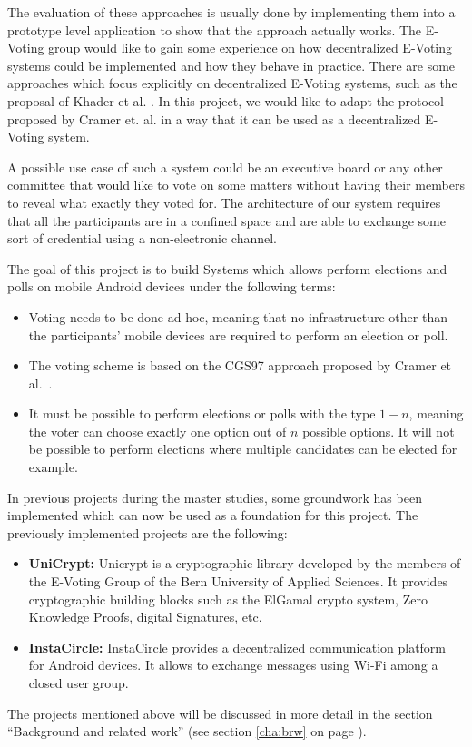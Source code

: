 \documentclass[numbers=noenddot, abstract=on]{scrreprt}
\newcommand{\myref}[1]{(see section \ref{#1} on page \pageref{#1})}
\begin{document}
The evaluation of these approaches is usually done by implementing them into a
prototype level application to show that the approach actually works. The
E-Voting group would like to gain some experience on how decentralized E-Voting
systems could be implemented and how they behave in practice. There are some
approaches which focus explicitly on decentralized E-Voting systems, such as the
proposal of Khader et al. \cite{HKRS12}. In this project, we would like to adapt
the protocol proposed by Cramer et. al. \cite{CGS97} in a way that it can be
used as a decentralized E-Voting system.

A possible use case of such a system could be an executive board or any other
committee that would like to vote on some matters without having their members
to reveal what exactly they voted for. The architecture of our system requires
that all the participants are in a confined space and are able to exchange some
sort of credential using a non-electronic channel.

The goal of this project is to build Systems which allows perform elections and
polls on mobile Android devices under the following terms:
\begin{itemize}
  \item Voting needs to be done ad-hoc, meaning that no infrastructure other
  than the participants' mobile devices are required to perform an election or
  poll.
  \item The voting scheme is based on the CGS97 approach proposed by Cramer et
  al.~\cite{CGS97}.
  \item It must be possible to perform elections or polls with the type $1-n$,
  meaning the voter can choose exactly one option out of $n$ possible options.
  It will not be possible to perform elections where multiple candidates can be
  elected for example.
\end{itemize}

In previous projects during the master studies, some groundwork has been
implemented which can now be used as a foundation for this project. The
previously implemented projects are the following:
\begin{itemize}
  \item \textbf{UniCrypt:} Unicrypt is a cryptographic library developed by the
  members of the E-Voting Group of the Bern University of Applied Sciences. It
  provides cryptographic building blocks such as the ElGamal crypto system, Zero
  Knowledge Proofs, digital Signatures, etc. 
  \item \textbf{InstaCircle: } InstaCircle provides a decentralized
  communication platform for Android devices. It allows to exchange messages
  using Wi-Fi among a closed user group.
\end{itemize}
The projects mentioned above will be discussed in more detail in the section
``Background and related work'' \myref{cha:brw}.
\end{document}
